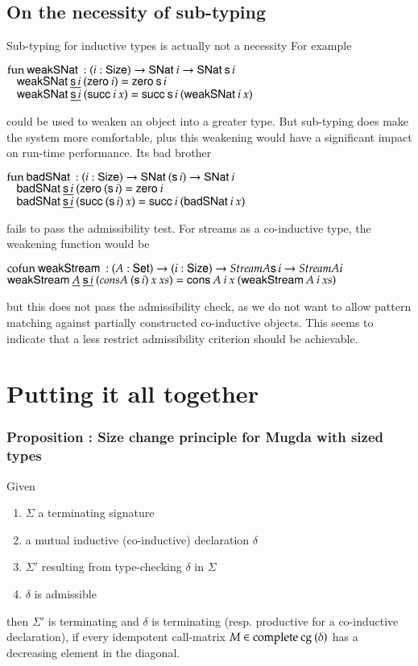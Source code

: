 \subsection{On the necessity of sub-typing}
Sub-typing for inductive types is actually not a necessity 
For example
\begin{bsp}
$\mathrm{fun}\: \mathsf{weakSNat}\: : (i : \mathsf{Size} ) \rightarrow \mathsf{SNat}\: i \rightarrow \mathsf{SNat}\: \mathsf{s}\, i$\\
$\hspace*{3mm} \mathsf{weakSNat}\: \underline{\mathsf{s}\, i} \: (\mathsf{zero}\: i) = \mathsf{zero}\: \mathsf{s}\, i$\\
$\hspace*{3mm} \mathsf{weakSNat}\: \underline{\mathsf{s}\, i} \: (\mathsf{succ}\: i \: x) = \mathsf{succ}\: \mathsf{s}\, i \: (\mathsf{weakSNat}\: i \: x) $
\end{bsp}
could be used to weaken an object into a greater type.
But sub-typing does make the system more comfortable, plus this weakening would have
a significant impact on run-time performance.
Its bad brother 
\begin{bsp}
$\mathrm{fun}\: \mathsf{badSNat}\: : (i : \mathsf{Size} ) \rightarrow \mathsf{SNat}\: (\mathsf{s}\, i) \rightarrow \mathsf{SNat}\: i$\\
$\hspace*{3mm} \mathsf{badSNat}\: \underline{\mathsf{s}\, i} \: (\mathsf{zero}\: (\mathsf{s}\, i) = \mathsf{zero}\: i$\\
$\hspace*{3mm} \mathsf{badSNat}\: \underline{\mathsf{s}\, i} \: (\mathsf{succ}\: (\mathsf{s}\, i) \: x) = \mathsf{succ}\: i \: (\mathsf{badSNat}\: i \: x) $
\end{bsp}
fails to pass the admissibility test. 
For streams as a co-inductive type, the weakening function would be
\begin{bsp}
$\mathrm{cofun}\: \mathsf{weakStream}\: : ( A : \mathsf{Set} ) \rightarrow (i : \mathsf{Size} ) \rightarrow Stream A \mathsf{s}\, i \rightarrow Stream A i$\\
$\mathsf{weakStream}\: \underline{A} \: \underline{\mathsf{s}\, i} \: (cons A \: (\mathsf{s}\, i) \: x \: xs) = \mathsf{cons}\: A \: i \: x \: (\mathsf{weakStream}\: A \: i \: xs) $
\end{bsp}
but this does not pass the admissibility check, as we do not want to allow pattern matching against 
partially constructed co-inductive objects. 
This seems to indicate that a less restrict admissibility criterion should be achievable.


\section{Putting it all together}


\subsubsection{Proposition : Size change principle for Mugda with sized types}
Given
\begin{enumerate}
\item
$\Sigma$ a terminating signature
\item
a mutual inductive (co-inductive) declaration $\delta$
\item
$\Sigma'$ resulting from type-checking $\delta$ in $\Sigma$
\item
$\delta$ is admissible
\end{enumerate}
then $\Sigma'$ is terminating and $\delta$ is terminating (resp. productive for a co-inductive declaration), if every idempotent call-matrix $ M \in \mathrm{complete}\: \mathrm{cg}\:(\delta)$ has a decreasing element in the diagonal.


